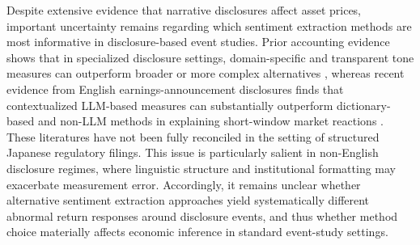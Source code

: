 Despite extensive evidence that narrative disclosures affect asset prices, important uncertainty remains regarding which sentiment extraction methods are most informative in disclosure-based event studies. Prior accounting evidence shows that in specialized disclosure settings, domain-specific and transparent tone measures can outperform broader or more complex alternatives \citep{henry2016measuring}, whereas recent evidence from English earnings-announcement disclosures finds that contextualized LLM-based measures can substantially outperform dictionary-based and non-LLM methods in explaining short-window market reactions \citep{siano2025news}. These literatures have not been fully reconciled in the setting of structured Japanese regulatory filings. This issue is particularly salient in non-English disclosure regimes, where linguistic structure and institutional formatting may exacerbate measurement error. Accordingly, it remains unclear whether alternative sentiment extraction approaches yield systematically different abnormal return responses around disclosure events, and thus whether method choice materially affects economic inference in standard event-study settings.
